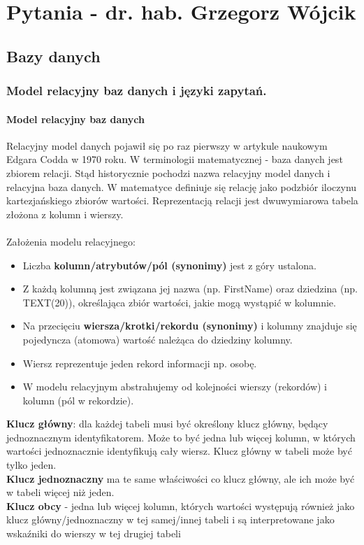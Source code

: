 \documentclass[a4paper,12pt,oneside]{book}
\begin{document}
	\chapter{Pytania - dr. hab. Grzegorz Wójcik}
	
		\section{Bazy danych}
			\subsection{Model relacyjny baz danych i języki zapytań.}
			
				\subsubsection{Model relacyjny baz danych}
				
				Relacyjny model danych pojawił się po raz pierwszy w artykule naukowym Edgara Codda w 1970 roku.
				W terminologii matematycznej - baza danych jest zbiorem relacji.  Stąd historycznie pochodzi nazwa relacyjny model danych i relacyjna baza danych. W matematyce definiuje się relację jako podzbiór iloczynu kartezjańskiego zbiorów wartości. Reprezentacją relacji jest dwuwymiarowa tabela złożona z kolumn i wierszy. \\ \\ Założenia modelu relacyjnego:
				\begin{itemize}
				\itemsep 0em
				\item Liczba \textbf{kolumn/atrybutów/pól (synonimy)} jest z góry ustalona.
				\item Z każdą kolumną jest związana jej nazwa (np. FirstName) oraz dziedzina (np. TEXT(20)), określająca zbiór wartości, jakie mogą wystąpić w kolumnie.
				\item Na przecięciu \textbf{wiersza/krotki/rekordu (synonimy)} i kolumny znajduje się pojedyncza (atomowa) wartość należąca do dziedziny kolumny.
				\item Wiersz reprezentuje jeden rekord informacji np. osobę.
				\item W modelu relacyjnym abstrahujemy od kolejności wierszy (rekordów) i kolumn (pól w rekordzie).
				\end{itemize}
				
				\noindent \textbf{Klucz główny}: dla każdej tabeli musi być określony klucz główny, będący jednoznacznym identyfikatorem. Może to być jedna lub więcej kolumn, w których wartości jednoznacznie identyfikują cały wiersz. Klucz główny w tabeli może być tylko jeden. \\
				\textbf{Klucz jednoznaczny} ma te same właściwości co klucz główny, ale ich może być w tabeli więcej niż jeden. \\
				\textbf{Klucz obcy} - jedna lub więcej kolumn, których wartości występują również jako klucz główny/jednoznaczny w tej samej/innej tabeli i są interpretowane jako wskaźniki do wierszy w tej drugiej tabeli
				
\end{document}
